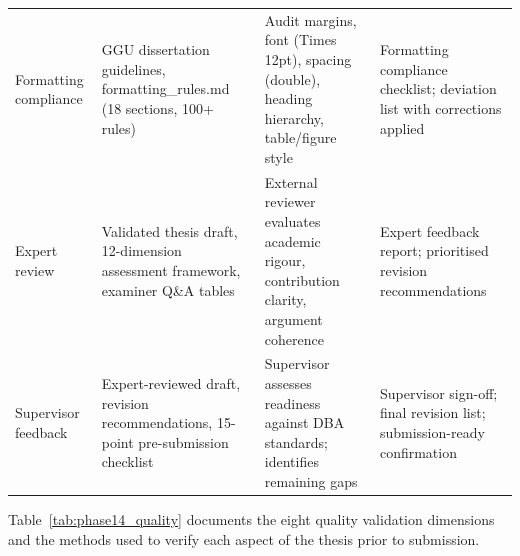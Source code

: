 \begin{xltabular}{\textwidth}{@{} >{\raggedright\arraybackslash}p{0.14\textwidth} X X X @{}}
\addlinespace
Formatting compliance        & GGU dissertation guidelines, formatting\_rules.md (18 sections, 100+ rules) & Audit margins, font (Times 12pt), spacing (double), heading hierarchy, table/figure style & Formatting compliance checklist; deviation list with corrections applied \\
\addlinespace
Expert review                & Validated thesis draft, 12-dimension assessment framework, examiner Q\&A tables & External reviewer evaluates academic rigour, contribution clarity, argument coherence & Expert feedback report; prioritised revision recommendations \\
\addlinespace
Supervisor feedback          & Expert-reviewed draft, revision recommendations, 15-point pre-submission checklist & Supervisor assesses readiness against DBA standards; identifies remaining gaps & Supervisor sign-off; final revision list; submission-ready confirmation \\
\end{xltabular}
\endgroup

\vspace{1.5em}

Table~\ref{tab:phase14_quality} documents the eight quality validation dimensions and the methods used to verify each aspect of the thesis prior to submission.

